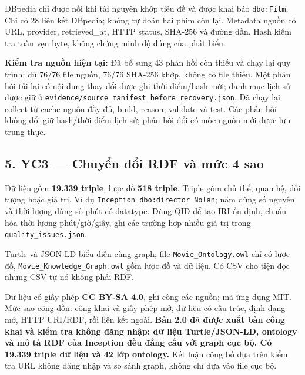 \documentclass[
  11pt,
]{article}
\begin{document}
DBpedia chỉ được nối khi tài nguyên khớp tiêu đề và được khai báo
\texttt{dbo:\allowbreak{}\allowbreak{}Film\allowbreak{}}. Chỉ có 28 liên
kết DBpedia; không tự đoán hai phim còn lại. Metadata nguồn có URL,
provider, retrieve\allowbreak{}d\_\allowbreak{}at, HTTP status, SHA-256
và đường dẫn. Hash kiểm tra toàn vẹn byte, không chứng minh độ đúng của
phát biểu.

\textbf{Kiểm tra nguồn hiện tại:} Đã bổ sung 43 phản hồi còn thiếu và
chạy lại quy trình: đủ 76/76 file nguồn, 76/76 SHA-256 khớp, không có
file thiếu. Một phản hồi tải lại có nội dung thay đổi được ghi thời
điểm/hash mới; danh mục lịch sử được giữ ở
\texttt{evidence\allowbreak{}/\allowbreak{}source\_\allowbreak{}manifest\allowbreak{}\_\allowbreak{}before\_\allowbreak{}recovery\allowbreak{}.\allowbreak{}json}.
Đã chạy lại collect từ cache nguồn đầy đủ, build, reason, validate và
test. Các phản hồi không đổi giữ hash/thời điểm lịch sử; phản hồi đổi có
mốc nguồn mới được lưu trung thực.

\subsection{5. YC3 --- Chuyển đổi RDF và mức 4
sao}\label{yc3-chuyux1ec3n-ux111ux1ed5i-rdf-vuxe0-mux1ee9c-4-sao}

Dữ liệu gồm \textbf{19.339 triple}, lược đồ \textbf{518 triple}. Triple
gồm chủ thể, quan hệ, đối tượng hoặc giá trị. Ví dụ
\texttt{Inceptio\allowbreak{}n dbo:\allowbreak{}di\allowbreak{}rector \allowbreak{}N\allowbreak{}olan};
năm dùng số nguyên và thời lượng dùng số phút có datatype. Dùng QID để
tạo IRI ổn định, chuẩn hóa thời lượng phút/giờ/giây, ghi các trường hợp
nhiều giá trị trong
\texttt{quality\_\allowbreak{}issues.\allowbreak{}j\allowbreak{}son}.

Turtle và JSON-LD biểu diễn cùng graph; file
\texttt{Movie\_\allowbreak{}\allowbreak{}On\allowbreak{}tology.\allowbreak{}o\allowbreak{}wl}
chỉ có lược đồ,
\texttt{Movie\_\allowbreak{}\allowbreak{}Kn\allowbreak{}owledge\_\allowbreak{}\allowbreak{}Graph.\allowbreak{}ow\allowbreak{}l}
gồm lược đồ và dữ liệu. Có CSV cho tiện đọc nhưng CSV tự nó không phải
RDF.

Dữ liệu có giấy phép \textbf{CC BY-SA 4.0}, ghi công các nguồn; mã ứng
dụng MIT. Mức sao cộng dồn: công khai và giấy phép mở, dữ liệu có cấu
trúc, định dạng mở, HTTP URI/RDF, rồi liên kết ngoài. \textbf{Bản 2.0 đã
được xuất bản công khai và kiểm tra không đăng nhập: dữ liệu
Turtle/\allowbreak{}\allowbreak{}J\allowbreak{}\allowbreak{}S\allowbreak{}O\allowbreak{}N-\allowbreak{}\allowbreak{}L\allowbreak{}D,
ontology và mô tả RDF của Inception đều đẳng cấu với graph cục bộ. Có
19.339 triple dữ liệu và 42 lớp ontology.} Kết luận công bố dựa trên
kiểm tra URL không đăng nhập và so sánh graph, không chỉ dựa vào file
cục bộ.
\end{document}
